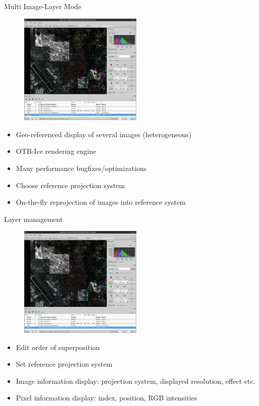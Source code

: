 \documentclass[smaller]{beamer}
\begin{document}
\begin{frame}{Multi Image-Layer Mode}

\begin{figure}[ht]
\begin{center}
\includegraphics[height=2.1in]{images/2016-06-06_MVD_Multi_Image-Layer_Support.png}
\end{center}
\end{figure}

\begin{itemize}
  \item Geo-referenced display of several images (heterogeneous)
  \item OTB-Ice rendering engine
  \item Many performance bugfixes/optimizations
  \item Choose reference projection system
  \item On-the-fly reprojection of images into reference system
\end{itemize}

\end{frame}

\begin{frame}{Layer management}

\begin{figure}[ht]
\begin{center}
\includegraphics[height=2.1in]{images/2016-06-06_MVD_Multi_Image-Layer_Support.png}
\end{center}
\end{figure}

\begin{itemize}
  \item Edit order of superposition
  \item Set reference projection system
  \item Image information display: projection system, displayed resolution, effect etc.
  \item Pixel information display: index, position, RGB intensities
\end{itemize}

\end{frame}
\end{document}
